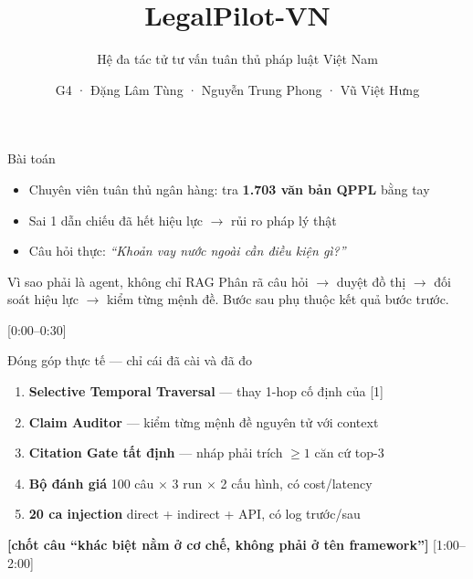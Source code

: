 \documentclass[aspectratio=169,10pt]{beamer}
\title{LegalPilot-VN}
\subtitle{Hệ đa tác tử tư vấn tuân thủ pháp luật Việt Nam}
\author{G4 · Đặng Lâm Tùng · Nguyễn Trung Phong · Vũ Việt Hưng}
\institute{CO5151 · HK261 · 09/12/2026}
\date{}
\newcommand{\TODO}[1]{\textcolor{accent}{\textbf{[#1]}}}
\newcommand{\tm}[1]{\hfill{\scriptsize\color{gray}[#1]}}
\begin{document}
\begin{frame}
  \titlepage
\end{frame}

\begin{frame}{Bài toán}
  \begin{itemize}
    \item Chuyên viên tuân thủ ngân hàng: tra \textbf{1.703 văn bản QPPL} bằng tay
    \item Sai 1 dẫn chiếu đã hết hiệu lực $\rightarrow$ rủi ro pháp lý thật
    \item Câu hỏi thực: \emph{“Khoản vay nước ngoài cần điều kiện gì?”}
  \end{itemize}
  \vspace{0.6em}
  \begin{block}{Vì sao phải là agent, không chỉ RAG}
    Phân rã câu hỏi $\rightarrow$ duyệt đồ thị $\rightarrow$ đối soát hiệu lực
    $\rightarrow$ kiểm từng mệnh đề. Bước sau phụ thuộc kết quả bước trước.
  \end{block}
  \tm{0:00–0:30}
\end{frame}

\begin{frame}{Đóng góp thực tế — chỉ cái đã cài và đã đo}
  \begin{enumerate}
    \item \textbf{Selective Temporal Traversal} — thay 1-hop cố định của [1]
    \item \textbf{Claim Auditor} — kiểm từng mệnh đề nguyên tử với context
    \item \textbf{Citation Gate tất định} — nháp phải trích $\geq1$ căn cứ top-3
    \item \textbf{Bộ đánh giá} 100 câu $\times$ 3 run $\times$ 2 cấu hình, có cost/latency
    \item \textbf{20 ca injection} direct + indirect + API, có log trước/sau
  \end{enumerate}
  \vspace{0.4em}
  \TODO{chốt câu “khác biệt nằm ở cơ chế, không phải ở tên framework”}
  \tm{1:00–2:00}
\end{frame}
\end{document}
